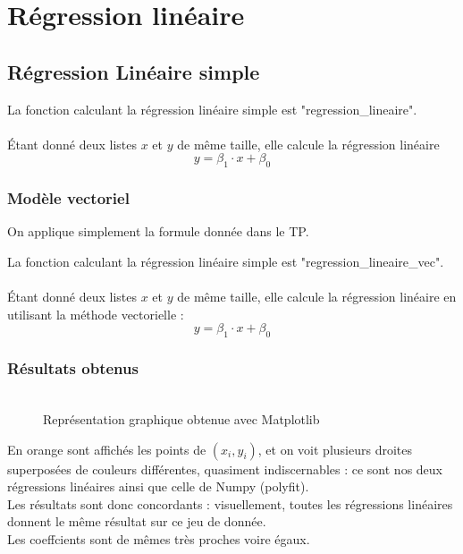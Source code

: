 \documentclass{article}      %
\begin{document}
\section{Régression linéaire}
\subsection{Régression Linéaire simple}
La fonction calculant la régression linéaire simple est "regression\_lineaire".
\\%
\\Étant donné deux listes $x$ et $y$ de même taille, elle calcule la régression linéaire $$y = \beta_1 \cdot x + \beta_0$$
%

\subsubsection{Modèle vectoriel}
On applique simplement la formule donnée dans le TP.

La fonction calculant la régression linéaire simple est "regression\_lineaire\_vec".
\\%
\\Étant donné deux listes $x$ et $y$ de même taille, elle calcule la régression linéaire en utilisant la méthode vectorielle : $$y = \beta_1 \cdot x + \beta_0$$
%


\subsubsection{Résultats obtenus}
\begin{figure}[H]
    \centering
    \\Représentation graphique obtenue avec Matplotlib
\end{figure}
%
En orange sont affichés les points de $(x_i, y_i)$, et on voit plusieurs droites superposées de couleurs différentes, quasiment indiscernables : ce sont nos deux régressions linéaires ainsi que celle de Numpy (polyfit).
\\Les résultats sont donc concordants : visuellement, toutes les régressions linéaires donnent le même résultat sur ce jeu de donnée.
%
\\Les coeffcients sont de mêmes très proches voire égaux.
\end{document}
